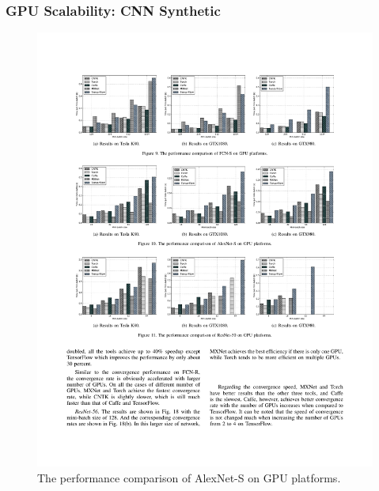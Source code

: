 \begin{frame}
	\MyLogo
	\frametitle{GPU Scalability: CNN Synthetic}

	\begin{figure}[htbp] 
		\includegraphics[width=\linewidth]{figures/AlexNet-S2.pdf} 
		\caption{The performance comparison of AlexNet-S on GPU platforms.}
	\end{figure}

\end{frame}


